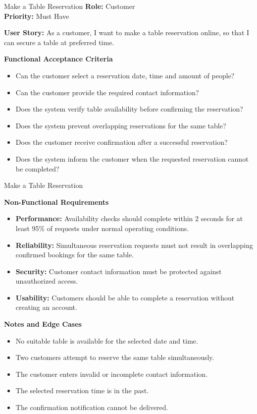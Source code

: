 
\begin{frame}{Make a Table Reservation}
\noindent\textbf{Role:} Customer\\
\textbf{Priority:} Must Have

\textbf{User Story:} As a customer, I want to make a table reservation online, so that I can secure a table at preferred time.

\textbf{Functional Acceptance Criteria}
\begin{itemize}
  \item Can the customer select a reservation date, time and amount of people?
  \item Can the customer provide the required contact information?
  \item Does the system verify table availability before confirming the reservation?
  \item Does the system prevent overlapping reservations for the same table?
  \item Does the customer receive confirmation after a successful reservation?
  \item Does the system inform the customer when the requested reservation cannot be completed?
\end{itemize}

\end{frame}

\begin{frame}{Make a Table Reservation}

\textbf{Non-Functional Requirements}
\begin{itemize}
  \item \textbf{Performance:} Availability checks should complete within 2 seconds for at least 95\% of requests under normal operating conditions.
  \item \textbf{Reliability:} Simultaneous reservation requests must not result in overlapping confirmed bookings for the same table.
  \item \textbf{Security:} Customer contact information must be protected against unauthorized access.
  \item \textbf{Usability:} Customers should be able to complete a reservation without creating an account.
\end{itemize}

\textbf{Notes and Edge Cases}
\begin{itemize}
  \item No suitable table is available for the selected date and time.
  \item Two customers attempt to reserve the same table simultaneously.
  \item The customer enters invalid or incomplete contact information.
  \item The selected reservation time is in the past.
  \item The confirmation notification cannot be delivered.
\end{itemize}

\end{frame}
